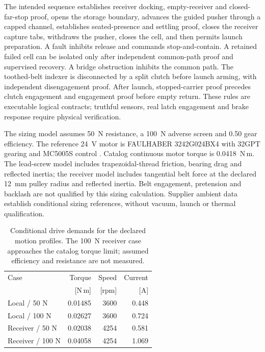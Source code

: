 \documentclass[conference]{IEEEtran}
\begin{document}
The intended sequence establishes receiver docking, empty-receiver and closed-far-stop proof, opens the storage boundary, advances the guided pusher through a capped channel, establishes seated-presence and settling proof, closes the receiver capture tabs, withdraws the pusher, closes the cell, and then permits launch preparation. A fault inhibits release and commands stop-and-contain. A retained failed cell can be isolated only after independent common-path proof and supervised recovery. A bridge obstruction inhibits the common path. The toothed-belt indexer is disconnected by a split clutch before launch arming, with independent disengagement proof. After launch, stopped-carrier proof precedes clutch engagement and engagement proof before empty return. These rules are executable logical contracts; truthful sensors, real latch engagement and brake response require physical verification.

The sizing model assumes 50~N resistance, a 100~N adverse screen and 0.50 gear efficiency. The reference 24~V motor is FAULHABER 3242G024BX4 with 32GPT gearing and MC5005S control \cite{faulhaber3242,feeder_gear,feeder_controller}. Catalog continuous motor torque is 0.0418~N\,m. The lead-screw model includes trapezoidal-thread friction, bearing drag and reflected inertia; the receiver model includes tangential belt force at the declared 12~mm pulley radius and reflected inertia. Belt engagement, pretension and backlash are not qualified by this sizing calculation. Supplier ambient data establish conditional sizing references, without vacuum, launch or thermal qualification.

\begin{table}[t]
\centering
\caption{Conditional drive demands for the declared motion profiles. The 100~N receiver case approaches the catalog torque limit; assumed efficiency and resistance are not measured.}
\label{tab:selected_feeder_drive}
\begin{tabular}{lrrr}
\toprule
Case & Torque & Speed & Current\\
 & [N\,m] & [rpm] & [A]\\
\midrule
Local / 50 N & 0.01485 & 3600 & 0.448\\
Local / 100 N & 0.02627 & 3600 & 0.724\\
Receiver / 50 N & 0.02038 & 4254 & 0.581\\
Receiver / 100 N & 0.04058 & 4254 & 1.069\\
\bottomrule
\end{tabular}
\end{table}
\end{document}
